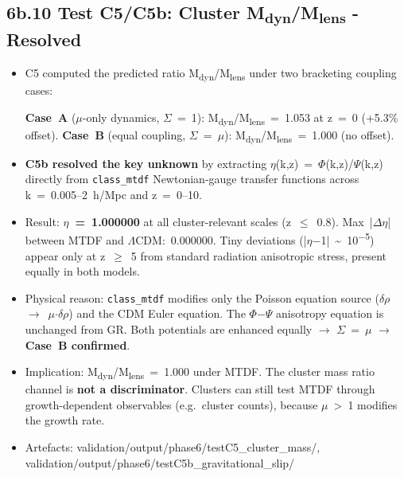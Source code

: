 \documentclass[11pt,a4paper]{article}
\begin{document}
\subsection{6b.10 Test C5/\allowbreak{}C5b: Cluster M\textsubscript{dyn}/M\textsubscript{lens}  -  Resolved}
\begin{itemize}
  \item C5 computed the predicted ratio M\textsubscript{dyn}/M\textsubscript{lens} under two bracketing coupling cases:
    
\textbf{Case~A} ($\mu$-only dynamics, $\Sigma$~=~1): M\textsubscript{dyn}/M\textsubscript{lens}~=~1.053 at z~=~0 (+5.3\% offset).
\textbf{Case~B} (equal coupling, $\Sigma$~=~$\mu$): M\textsubscript{dyn}/M\textsubscript{lens}~=~1.000 (no offset).
  \item \textbf{C5b resolved the key unknown} by extracting $\eta$(k,z)~=~$\Phi$(k,z)/$\Psi$(k,z) directly from \texttt{class\_\allowbreak{}mtdf} Newtonian-gauge transfer functions across k~=~0.005--2~h/\allowbreak{}Mpc and z~=~0--10.
  \item Result: \textbf{$\eta$~=~1.000000} at all cluster-relevant scales (z~$\le$~0.8). Max~|$\Delta$$\eta$| between MTDF and $\Lambda$CDM:~0.000000. Tiny deviations (|$\eta$$-$1|~\~{}~10\textsuperscript{$-$5}) appear only at z~$\ge$~5 from standard radiation anisotropic stress, present equally in both models.
  \item Physical reason: \texttt{class\_\allowbreak{}mtdf} modifies only the Poisson equation source ($\delta$$\rho$~$\rightarrow$~$\mu$$\cdot$$\delta$$\rho$) and the CDM Euler equation. The $\Phi$$-$$\Psi$ anisotropy equation is unchanged from GR. Both potentials are enhanced equally $\rightarrow$ $\Sigma$~=~$\mu$ $\rightarrow$ \textbf{Case~B confirmed}.
  \item Implication: M\textsubscript{dyn}/M\textsubscript{lens}~=~1.000 under MTDF. The cluster mass ratio channel is \textbf{not a discriminator}. Clusters can still test MTDF through growth-dependent observables (e.g.~cluster counts), because $\mu$~>~1 modifies the growth rate.
  \item Artefacts: validation/\allowbreak{}output/\allowbreak{}phase6/\allowbreak{}testC5\_\allowbreak{}cluster\_\allowbreak{}mass/\allowbreak{}, validation/\allowbreak{}output/\allowbreak{}phase6/\allowbreak{}testC5b\_\allowbreak{}gravitational\_\allowbreak{}slip/\allowbreak{}
\end{itemize}
\end{document}
